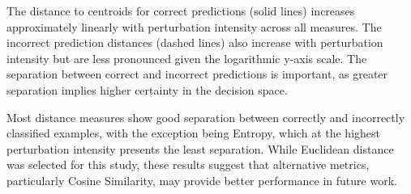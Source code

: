 The distance to centroids for correct predictions (solid lines) increases approximately linearly with perturbation intensity across all measures. The incorrect prediction distances (dashed lines) also increase with perturbation intensity but are less pronounced given the logarithmic y-axis scale. The separation between correct and incorrect predictions is important, as greater separation implies higher certainty in the decision space.

Most distance measures show good separation between correctly and incorrectly classified examples, with the exception being Entropy, which at the highest perturbation intensity presents the least separation. While Euclidean distance was selected for this study, these results suggest that alternative metrics, particularly Cosine Similarity, may provide better performance in future work.